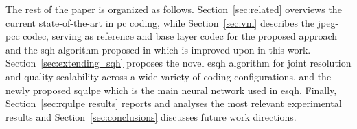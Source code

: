 The rest of the paper is organized as follows. Section~\ref{sec:related} overviews
the current state-of-the-art in \gls{pc} coding, while Section~\ref{sec:vm} describes the \gls{jpeg-pcc} codec, serving as reference and base layer codec for the proposed approach and the \gls{sqh} algorithm proposed in \cite{mari2024point} which is improved upon in this work. 
Section~\ref{sec:extending_sqh} proposes the novel \gls{esqh} algorithm for joint resolution and quality scalability across a wide variety of coding configurations, and the newly proposed \gls{squlpe} which is the main neural network used in \gls{esqh}. Finally, Section~\ref{sec:rqulpe results} reports
and analyses the most relevant experimental results and Section~\ref{sec:conclusions}
discusses future work directions.